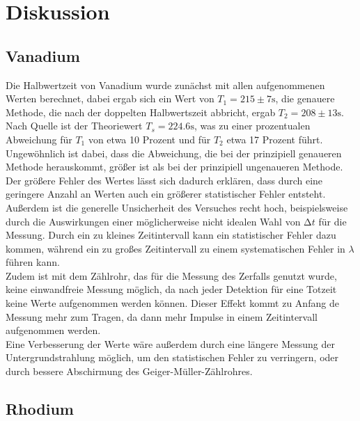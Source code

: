 \section{Diskussion}
\label{sec:Diskussion}

\subsection{Vanadium}

Die Halbwertzeit von Vanadium wurde zunächst mit allen aufgenommenen Werten berechnet, dabei ergab sich ein Wert
von $T_1 = 215 \pm 7 \si{\s}$, die genauere Methode, die nach der doppelten Halbwertszeit abbricht, ergab 
$T_2 = 208 \pm 13 \si{\s}$. Nach Quelle %
ist der Theoriewert $T_s = 224.6 \si{\s}$, was zu einer prozentualen Abweichung für $T_1$ von etwa 10 Prozent und für 
$T_2$ etwa 17 Prozent führt. Ungewöhnlich ist dabei, dass die Abweichung, die bei der prinzipiell genaueren Methode herauskommt,
größer ist als bei der prinzipiell ungenaueren Methode. 
Der größere Fehler des Wertes lässt sich dadurch erklären, dass durch eine geringere Anzahl an Werten auch ein größerer statistischer Fehler entsteht. 
Außerdem ist die generelle Unsicherheit des Versuches recht hoch, beispielsweise durch die Auswirkungen einer möglicherweise nicht idealen Wahl von $\increment t$
für die Messung. Durch ein zu kleines Zeitintervall kann ein statistischer Fehler dazu kommen, während ein zu großes Zeitintervall zu einem systematischen Fehler in 
$\lambda$ führen kann. \\
Zudem ist mit dem Zählrohr, das für die Messung des Zerfalls genutzt wurde, keine einwandfreie Messung möglich, da nach jeder Detektion für eine Totzeit keine Werte 
aufgenommen werden können. Dieser Effekt kommt zu Anfang de Messung mehr zum Tragen, da dann mehr Impulse in einem Zeitintervall aufgenommen werden.\\
Eine Verbesserung der Werte wäre außerdem durch eine längere Messung der Untergrundstrahlung möglich, um den statistischen Fehler zu verringern, oder durch bessere Abschirmung
des Geiger-Müller-Zählrohres.

\subsection{Rhodium}

